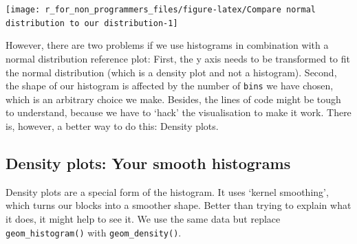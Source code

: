 \documentclass[
]{book}
\newenvironment{Shaded}{\begin{snugshade}}{\end{snugshade}}
\newcommand{\AttributeTok}[1]{\textcolor[rgb]{0.77,0.63,0.00}{#1}}
\newcommand{\CommentTok}[1]{\textcolor[rgb]{0.56,0.35,0.01}{\textit{#1}}}
\newcommand{\DecValTok}[1]{\textcolor[rgb]{0.00,0.00,0.81}{#1}}
\newcommand{\FunctionTok}[1]{\textcolor[rgb]{0.00,0.00,0.00}{#1}}
\newcommand{\NormalTok}[1]{#1}
\newcommand{\SpecialCharTok}[1]{\textcolor[rgb]{0.00,0.00,0.00}{#1}}
\newcommand{\StringTok}[1]{\textcolor[rgb]{0.31,0.60,0.02}{#1}}
\begin{document}
\begin{Shaded}
\end{Shaded}

\begin{center}\texttt{[image: r\_for\_non\_programmers\_files/figure-latex/Compare normal distribution to our distribution-1]} \end{center}

However, there are two problems if we use histograms in combination with a normal distribution reference plot: First, the y axis needs to be transformed to fit the normal distribution (which is a density plot and not a histogram). Second, the shape of our histogram is affected by the number of \texttt{bins} we have chosen, which is an arbitrary choice we make. Besides, the lines of code might be tough to understand, because we have to `hack' the visualisation to make it work. There is, however, a better way to do this: Density plots.

\hypertarget{density-plots-your-smooth-histograms}{%
\subsection{Density plots: Your smooth histograms}\label{density-plots-your-smooth-histograms}}

Density plots are a special form of the histogram. It uses `kernel smoothing', which turns our blocks into a smoother shape. Better than trying to explain what it does, it might help to see it. We use the same data but replace \texttt{geom\_histogram()} with \texttt{geom\_density()}.
\end{document}
